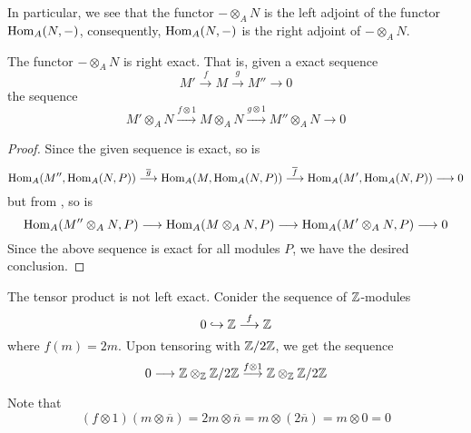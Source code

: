 In particular, we see that the functor $-\otimes_A N$ is the left adjoint of the functor $\operatorname{Hom}_A(N,-)$, consequently, $\operatorname{Hom}_A(N,-)$ is the right adjoint of $-\otimes_A N$.

\begin{theorem}
    The functor $-\otimes_A N$ is right exact. That is, given a exact sequence
    \begin{equation*}
        M'\stackrel{f}{\longrightarrow}M\stackrel{g}{\longrightarrow}M''\longrightarrow 0
    \end{equation*}
    the sequence 
    \begin{equation*}
        M'\otimes_A N\stackrel{f\otimes 1}{\longrightarrow}M\otimes_A N\stackrel{g\otimes 1}{\longrightarrow}M''\otimes_A N\longrightarrow 0
    \end{equation*}
\end{theorem}
\begin{proof}
    Since the given sequence is exact, so is 
    \begin{equation*}
        \operatorname{Hom}_A(M'',\operatorname{Hom}_A(N,P))\stackrel{\overline g}{\longrightarrow}\operatorname{Hom}_A(M,\operatorname{Hom}_A(N,P))\stackrel{\overline f}{\longrightarrow}\operatorname{Hom}_A(M',\operatorname{Hom}_A(N,P))\longrightarrow 0
    \end{equation*}
    but from , so is
    \begin{equation*}
        \operatorname{Hom}_A(M''\otimes_A N, P)\longrightarrow\operatorname{Hom}_A(M\otimes_A N, P)\longrightarrow\operatorname{Hom}_A(M'\otimes_A N, P)\longrightarrow 0
    \end{equation*}
    Since the above sequence is exact for all modules $P$, we have the desired conclusion.
\end{proof}

The tensor product is not left exact. Conider the sequence of $\mathbb{Z}$-modules
\begin{equation*}
    0\hookrightarrow\mathbb{Z}\stackrel{f}{\longrightarrow}\mathbb{Z}
\end{equation*}
where $f(m) = 2m$. Upon tensoring with $\mathbb{Z}/2\mathbb{Z}$, we get the sequence 
\begin{equation*}
    0\longrightarrow\mathbb{Z}\otimes_{\mathbb{Z}}\mathbb{Z}/2\mathbb{Z}\stackrel{f\otimes1}{\longrightarrow}\mathbb{Z}\otimes_{\mathbb{Z}}\mathbb{Z}/2\mathbb{Z}
\end{equation*}

Note that 
\begin{equation*}
    (f\otimes 1)(m\otimes\overline n) = 2m\otimes\overline{n} = m\otimes(2\overline n) = m\otimes 0 = 0
\end{equation*}

